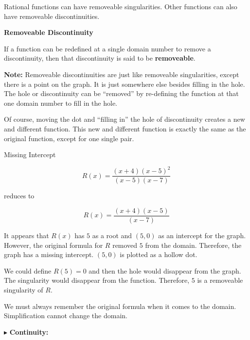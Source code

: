 \documentclass{ximera}
\begin{document}
Rational functions can have removeable singularities. Other functions can also have removeable discontinuities.

\begin{definition} \textbf{\textcolor{green!50!black}{Removeable Discontinuity}}

If a function can be redefined at a single domain number to remove a discontinuity, then that discontinuity is said to be \textbf{removeable}.

\end{definition}

\textbf{Note:} Removeable discontinuities are just like removeable singularities, except there is a point on the graph.  It is just somewhere else besides filling in the hole.  The hole or discontinuity can be ``removed'' by re-defining the function at that one domain number to fill in the hole.

Of course, moving the dot and ``filling in'' the hole of discontinuity creates a new and different function.  This new and different function is exactly the same as the original function, except for one single pair.






\begin{example}  Missing Intercept

\[     R(x) = \frac{(x+4)(x-5)^2}{(x-5)(x-7)}     \]

reduces to 

\[     R(x) = \frac{(x+4)(x-5)}{(x-7)}     \]


It appears that $R(x)$ has $5$ as a root and $(5,0)$ as an intercept for the graph.  However, the original formula for $R$ removed $5$ from the domain.  Therefore, the graph has a missing intercept. $(5,0)$ is plotted as a hollow dot.



We could define $R(5)=0$ and then the hole would disappear from the graph.  The singularity would disappear from the function. Therefore, $5$ is a removeable singularity of $R$.


\end{example}

We must always remember the original formula when it comes to the domain.  Simplification cannot change the domain. 





$\blacktriangleright$ \textbf{\textcolor{red!10!blue!90!}{Continuity:}} 
\end{document}
